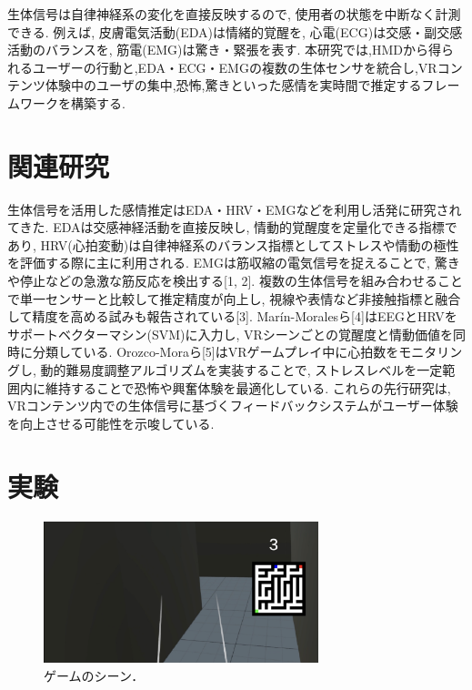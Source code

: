 \documentclass[a4paper]{jarticle}
\begin{document}
生体信号は自律神経系の変化を直接反映するので, 使用者の状態を中断なく計測できる. 例えば, 皮膚電気活動(EDA)は情緒的覚醒を, 心電(ECG)は交感・副交感活動のバランスを, 筋電(EMG)は驚き・緊張を表す. 本研究では,HMDから得られるユーザーの行動と,EDA・ECG・EMGの複数の生体センサを統合し,VRコンテンツ体験中のユーザの集中,恐怖,驚きといった感情を実時間で推定するフレームワークを構築する.

\section{関連研究}%

生体信号を活用した感情推定はEDA・HRV・EMGなどを利用し活発に研究されてきた. EDAは交感神経活動を直接反映し, 情動的覚醒度を定量化できる指標であり, HRV(心拍変動)は自律神経系のバランス指標としてストレスや情動の極性を評価する際に主に利用される. EMGは筋収縮の電気信号を捉えることで, 驚きや停止などの急激な筋反応を検出する[1, 2]. 複数の生体信号を組み合わせることで単一センサーと比較して推定精度が向上し, 視線や表情など非接触指標と融合して精度を高める試みも報告されている[3]. Marín-Moralesら[4]はEEGとHRVをサポートベクターマシン(SVM)に入力し, VRシーンごとの覚醒度と情動価値を同時に分類している. Orozco-Moraら[5]はVRゲームプレイ中に心拍数をモニタリングし, 動的難易度調整アルゴリズムを実装することで, ストレスレベルを一定範囲内に維持することで恐怖や興奮体験を最適化している. これらの先行研究は, VRコンテンツ内での生体信号に基づくフィードバックシステムがユーザー体験を向上させる可能性を示唆している.

\section{実験}%

\begin{figure}[tb]
  \begin{center}
    \includegraphics*[width=80mm]{game1.png}
  \end{center}
  \vspace*{-6mm}
  \caption{ゲームのシーン．}
  \label{figure1}
\end{figure}
\end{document}
